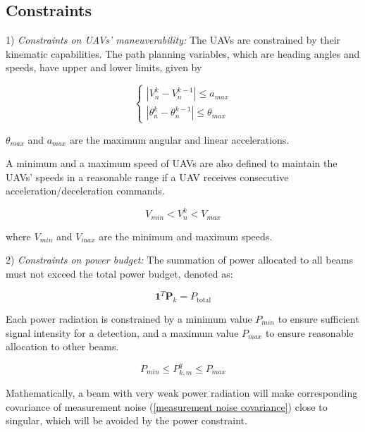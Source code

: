 \documentclass[12pt,journal,draftclsnofoot,onecolumn]{IEEEtran}
\begin{document}
\subsection{Constraints}
1) \emph{Constraints on UAVs' maneuverability:} The UAVs are constrained by their kinematic capabilities. The path planning variables, which are heading angles and speeds, have upper and lower limits, given by 

\begin{equation}
	\left\{
	\begin{array}{lr}
		|V_n^k-V_n^{k-1}|\leq a_{max}
		\\|\theta_n^k-\theta_n^{k-1}|\leq \theta_{max}
	\end{array}
	\right.
	\label{UAV maneuverability}
\end{equation}

$\theta_{max}$ and $a_{max}$ are the maximum angular and linear accelerations.

A minimum and a maximum speed of UAVs are also defined to maintain the UAVs' speeds in a reasonable range if a UAV receives consecutive acceleration/deceleration commands.

\begin{equation}
	V_{min}<V_n^k<V_{max}
	\label{UAV speed}
\end{equation}

where $V_{min}$ and $V_{max}$ are the minimum and maximum speeds.

2) \emph{Constraints on power budget:} The summation of power allocated to all beams must not exceed the total power budget, denoted as:

\begin{equation}
	{{\mathbf 1}^T}{{\mathbf P}_k}={P_{\text{total}}}
	\label{total power budget}
\end{equation}

Each power radiation is constrained by a minimum value $P_{min}$ to ensure sufficient signal intensity for a detection, and a maximum value $P_{max}$ to ensure reasonable allocation to other beams.

\begin{equation}
	P_{min}\leq P_{k,m}^q\leq P_{max}
	\label{power range}
\end{equation}

Mathematically, a beam with very weak power radiation will make corresponding covariance of measurement noise (\ref{measurement noise covariance}) close to singular, which will be avoided by the power constraint.
\end{document}
